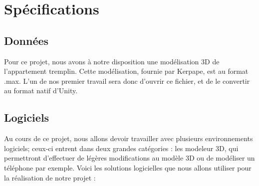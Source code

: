 \section{Spécifications}

\subsection{Données}
	Pour ce projet, nous avons à notre disposition une modélisation 3D de l'appartement tremplin. Cette modélisation, fournie par Kerpape, est au format .max.
	L'un de nos premier travail sera donc d'ouvrir ce fichier, et de le convertir au format natif d'Unity. 
	

\subsection{Logiciels}
	Au cours de ce projet, nous allons devoir travailler avec plusieurs environnements logiciels; ceux-ci entrent dans deux grandes catégories : les modeleur 3D, qui permettront d'effectuer de légères modifications au modèle 3D ou de modéliser un téléphone par exemple.
	Voici les solutions logicielles que nous allons utiliser pour la réalisation de notre projet :
